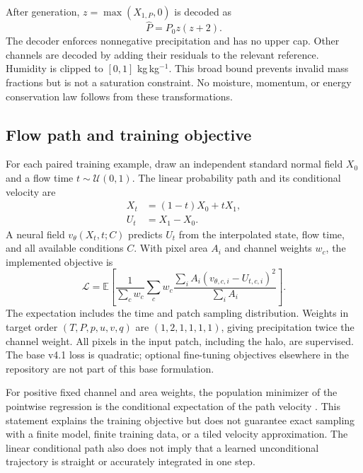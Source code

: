 \documentclass[10pt]{article}
\newcommand{\E}{\mathbb{E}}
\begin{document}
After generation, $z=\max(X_{1,P},0)$ is decoded as
\begin{equation}
\widehat P=P_0z(z+2).
\label{eq:decode}
\end{equation}
The decoder enforces nonnegative precipitation and has no upper cap. Other channels are decoded by adding their residuals to the relevant reference. Humidity is clipped to $[0,1]$ kg\,kg$^{-1}$. This broad bound prevents invalid mass fractions but is not a saturation constraint. No moisture, momentum, or energy conservation law follows from these transformations.



\subsection{Flow path and training objective}
For each paired training example, draw an independent standard normal field $X_0$ and a flow time $t\sim\mathcal U(0,1)$. The linear probability path and its conditional velocity are
\begin{align}
X_t&=(1-t)X_0+tX_1,\\
U_t&=X_1-X_0.
\end{align}
A neural field $v_\theta(X_t,t;C)$ predicts $U_t$ from the interpolated state, flow time, and all available conditions $C$. With pixel area $A_i$ and channel weights $w_c$, the implemented objective is
\begin{equation}
\mathcal L=\E\left[
\frac{1}{\sum_c w_c}\sum_c w_c
\frac{\sum_i A_i\left(v_{\theta,c,i}-U_{t,c,i}\right)^2}
{\sum_i A_i}\right].
\label{eq:loss}
\end{equation}
The expectation includes the time and patch sampling distribution. Weights in target order $(T,P,p,u,v,q)$ are $(1,2,1,1,1,1)$, giving precipitation twice the channel weight. All pixels in the input patch, including the halo, are supervised. The base v4.1 loss is quadratic; optional fine-tuning objectives elsewhere in the repository are not part of this base formulation.

For positive fixed channel and area weights, the population minimizer of the pointwise regression is the conditional expectation of the path velocity \citep{lipman2023,liu2023}. This statement explains the training objective but does not guarantee exact sampling with a finite model, finite training data, or a tiled velocity approximation. The linear conditional path also does not imply that a learned unconditional trajectory is straight or accurately integrated in one step.
\end{document}
